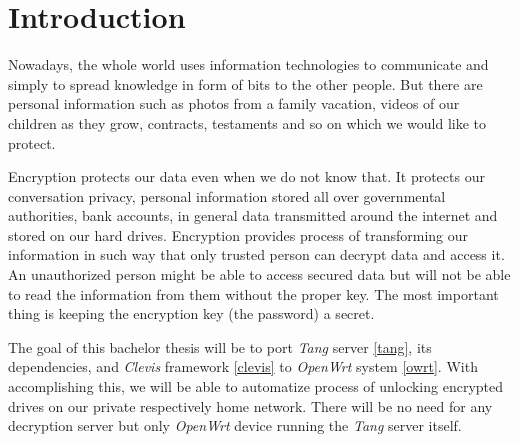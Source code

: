 \documentclass[../xdudla00-porting-Tang-to-Open-WRT.tex]{subfiles}
\begin{document}

\chapter{Introduction}\label{introduction}

Nowadays, the whole world uses information technologies to communicate and simply to spread knowledge in form of bits to the other people.
But there are personal information such as photos from a family vacation, videos of our children as they grow, contracts, testaments and so on which we would like to protect.

Encryption protects our data even when we do not know that.
It protects our conversation privacy, personal information stored all over governmental authorities, bank accounts, in general data transmitted around the internet and stored on our hard drives.
Encryption provides process of transforming our information in such way that only trusted person can decrypt data and access it.
An unauthorized person might be able to access secured data but will not be able to read the information from them without the proper key.
The most important thing is keeping the encryption key (the password) a secret.

The goal of this bachelor thesis will be to port %
{\it Tang} server \ref{tang}, its dependencies, and {\it Clevis} framework \ref{clevis} to {\it OpenWrt} system \ref{owrt}.
With accomplishing this, we will be able to automatize process of unlocking encrypted drives on our private respectively home network.
There will be no need for any decryption server but only {\it OpenWrt} device running the {\it Tang} server itself.
\end{document}
